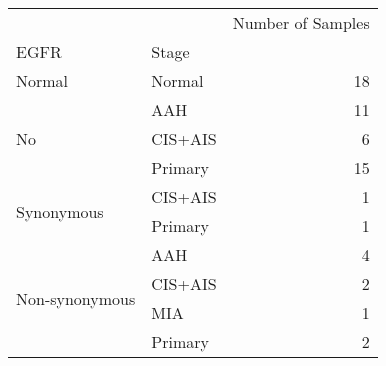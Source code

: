 \begin{tabular}{l|lr}
\toprule
               &         & Number of Samples \\
EGFR & Stage &                   \\
\midrule
Normal & Normal &                18 \\
\multirow{3}{*}{No} & AAH &                11 \\
               & CIS+AIS &                 6 \\
               & Primary &                15 \\
\cline{1-3}
\multirow{2}{*}{Synonymous} & CIS+AIS &                 1 \\
               & Primary &                 1 \\
\cline{1-3}
\multirow{4}{*}{Non-synonymous} & AAH &                 4 \\
               & CIS+AIS &                 2 \\
               & MIA &                 1 \\
               & Primary &                 2 \\
\bottomrule
\end{tabular}
